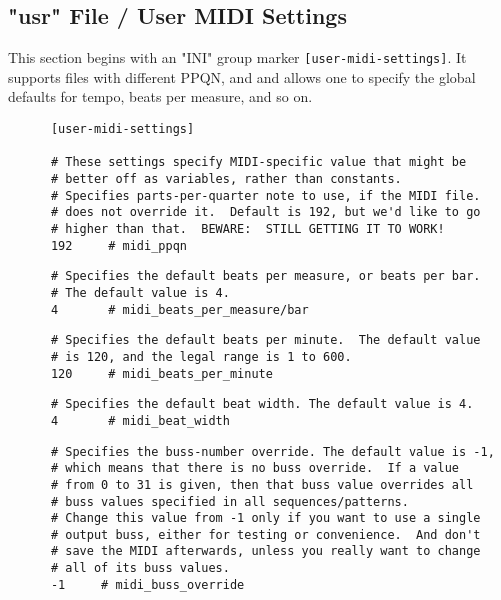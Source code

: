 \subsection{"usr" File / User MIDI Settings}
\label{subsec:seq66_usr_file_user_midi_settings}

   This section begins with an
   "INI" group marker \texttt{[user-midi-settings]}.
   It supports files with different PPQN, and and allows one to specify the
   global defaults for tempo, beats per measure, and so on.

   \begin{verbatim}
      [user-midi-settings]

      # These settings specify MIDI-specific value that might be
      # better off as variables, rather than constants.
      # Specifies parts-per-quarter note to use, if the MIDI file.
      # does not override it.  Default is 192, but we'd like to go
      # higher than that.  BEWARE:  STILL GETTING IT TO WORK!
      192     # midi_ppqn
   \end{verbatim}

   \begin{verbatim}
      # Specifies the default beats per measure, or beats per bar.
      # The default value is 4.
      4       # midi_beats_per_measure/bar
   \end{verbatim}

   \begin{verbatim}
      # Specifies the default beats per minute.  The default value
      # is 120, and the legal range is 1 to 600.
      120     # midi_beats_per_minute
   \end{verbatim}

   \begin{verbatim}
      # Specifies the default beat width. The default value is 4.
      4       # midi_beat_width
   \end{verbatim}

   \begin{verbatim}
      # Specifies the buss-number override. The default value is -1,
      # which means that there is no buss override.  If a value
      # from 0 to 31 is given, then that buss value overrides all
      # buss values specified in all sequences/patterns.
      # Change this value from -1 only if you want to use a single
      # output buss, either for testing or convenience.  And don't
      # save the MIDI afterwards, unless you really want to change
      # all of its buss values.
      -1     # midi_buss_override
   \end{verbatim}

